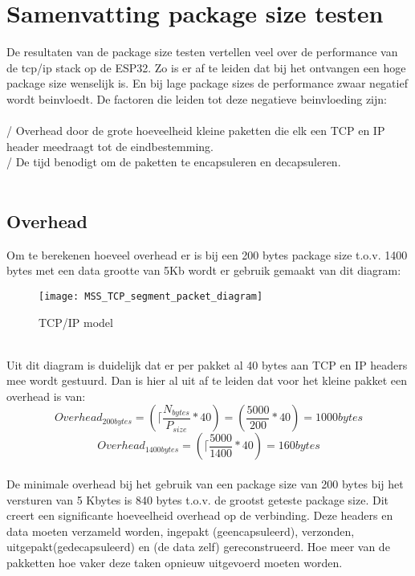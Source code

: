 \documentclass[../DCM2_Verslag.tex]{subfiles}
\begin{document}
\section{Samenvatting package size testen}
De resultaten van de package size testen vertellen veel over de performance van de tcp/ip stack op de ESP32. Zo is er af te leiden dat bij het ontvangen een hoge package size wenselijk is. En bij lage package sizes de performance zwaar negatief wordt beinvloedt. De factoren die leiden tot deze negatieve beinvloeding zijn:\\\\ \-/ Overhead door de grote hoeveelheid kleine paketten die elk een TCP en IP header meedraagt tot de eindbestemming.\\
\-/ De tijd benodigt om de paketten te encapsuleren en decapsuleren.
\\\\
\clearpage
\subsection{Overhead}
Om te berekenen hoeveel overhead er is bij een 200 bytes package size t.o.v. 1400 bytes met een data grootte van 5Kb wordt er gebruik gemaakt van dit diagram:\\
\begin{figure}[h]
\centering
\texttt{[image: MSS\_TCP\_segment\_packet\_diagram]}
\caption{TCP/IP model}
\end{figure}
\\
Uit dit diagram is duidelijk dat er per pakket al 40 bytes aan TCP en IP headers mee wordt gestuurd. Dan is hier al uit af te leiden dat voor het kleine pakket een overhead is van:
\[Overhead_{200bytes} = (\lceil{\frac{N_{bytes}}{P_{size}}} * 40) =  (\frac{5000}{200}*40)= 1000 bytes\]
\[Overhead_{1400bytes} = (\lceil{\frac{5000}{1400}}*40)= 160 bytes\]
\\
De minimale overhead bij het gebruik van een package size van 200 bytes bij het versturen van 5 Kbytes is 840 bytes t.o.v. de grootst geteste package size. Dit creert een significante hoeveelheid overhead op de verbinding. Deze headers en data moeten verzameld worden, ingepakt (geencapsuleerd), verzonden, uitgepakt(gedecapsuleerd) en (de data zelf) gereconstrueerd. Hoe meer van de pakketten hoe vaker deze taken opnieuw uitgevoerd moeten worden.
\clearpage
\end{document}
